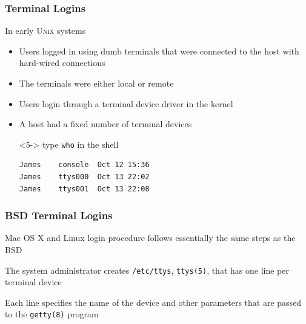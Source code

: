 \documentclass[newPxFont,sthlmFooter,nooffset]{beamer}
\begin{document}
\begin{frame}[fragile,t]
  \frametitle{Terminal Logins}
In early \textsc{Unix} systems
\begin{itemize}
\item <1-> Users logged in using dumb terminals that were connected to the host with hard-wired connections
\item <2-> The terminals were either local or remote
\item <3-> Users login through a terminal device driver in the kernel
\item <4-> A host had a fixed number of terminal devices

\item [ ] <5-> type \texttt{who} in the shell
\begin{verbatim}
James    console  Oct 12 15:36
James    ttys000  Oct 13 22:02
James    ttys001  Oct 13 22:08
\end{verbatim}
\end{itemize}
\end{frame}


\begin{frame}[t]
  \frametitle{BSD Terminal Logins}

Mac OS X and Linux login procedure follows essentially the same steps as the BSD 

The system administrator creates \texttt{/etc/ttys}, \texttt{ttys(5)}, that has one line per terminal device

Each line specifies the name of the device and other parameters that are passed to the \texttt{getty(8)} program
\end{frame}
\end{document}
